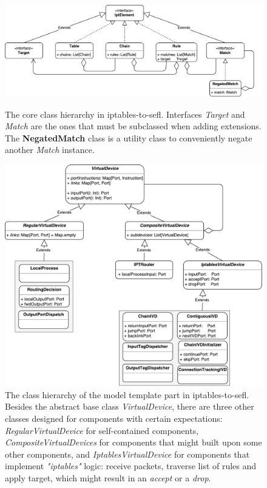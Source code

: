 \clearpage
\begin{figure}[h]
  \centering
  \captionsetup{justification=centering}

  \includegraphics[scale=0.5]{src/img/ipt-hierarchy}
  \caption[The core class hierarchy in iptables-to-sefl.]{The core class
  hierarchy in iptables-to-sefl.  Interfaces \emph{Target} and \emph{Match} are
  the ones that must be subclassed when adding extensions.  The
  \textbf{NegatedMatch} class is a utility class to conveniently negate another
  \emph{Match} instance.}
  \label{fig:ipt-hierarchy}

  \vspace*{\floatsep} %

  \includegraphics[scale=0.55]{src/img/virtdev-hierarchy}
  \caption[The class hierarchy of the model template part in
  iptables-to-sefl.]{The class hierarchy of the model template part in
  iptables-to-sefl. Besides the abstract base class \emph{VirtualDevice},
  there are three other classes designed for components with certain
  expectations: \emph{RegularVirtualDevice} for self-contained components,
  \emph{CompositeVirtualDevices} for components that might built upon some
  other components, and \emph{IptablesVirtualDevice} for components that
  implement \emph{"iptables"} logic: receive packets, traverse list of rules
  and apply target, which might result in an \emph{accept} or a \emph{drop}.}
  \label{fig:virtdev-hierarchy}
\end{figure}
\clearpage

